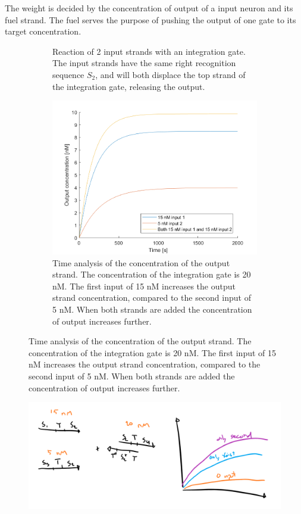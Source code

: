 The weight is decided by the concentration of output of a input neuron and its fuel strand. The fuel serves the purpose of pushing the output of one gate to its target concentration.

\begin{figure}[H]
  \begin{subfigure}[t]{.49\columnwidth}
    \centering
{} {

}
\caption{Reaction of 2 input strands with an integration gate. The input strands have the same right recognition sequence $S_2$, and will both displace the top strand of the integration gate, releasing the output.}
\label{}
\end{subfigure}
\hfill
\begin{subfigure}[t]{.49\columnwidth}
  \centering
\includegraphics[width=\linewidth]{images/integration.png}
\caption{Time analysis of the concentration of the output strand. The concentration of the integration gate is 20 nM. The first input of 15 nM increases the output strand concentration, compared to the second input of 5 nM. When both strands are added the concentration of output increases further.}
\label{}
\end{subfigure}
\label{seesaw_integration}
\end{figure}

\begin{figure}[H]
\centering
\includegraphics[width=\columnwidth]{images/seesaw_weight.png}
\caption{}
\label{seesaw_weight}
\end{figure}

